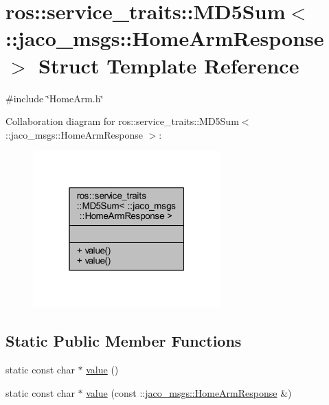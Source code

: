 \hypertarget{structros_1_1service__traits_1_1MD5Sum_3_01_1_1jaco__msgs_1_1HomeArmResponse_01_4}{}\section{ros\+:\+:service\+\_\+traits\+:\+:M\+D5\+Sum$<$ \+:\+:jaco\+\_\+msgs\+:\+:Home\+Arm\+Response $>$ Struct Template Reference}
\label{structros_1_1service__traits_1_1MD5Sum_3_01_1_1jaco__msgs_1_1HomeArmResponse_01_4}


{\ttfamily \#include \char`\"{}Home\+Arm.\+h\char`\"{}}



Collaboration diagram for ros\+:\+:service\+\_\+traits\+:\+:M\+D5\+Sum$<$ \+:\+:jaco\+\_\+msgs\+:\+:Home\+Arm\+Response $>$\+:
\nopagebreak
\begin{figure}[H]
\begin{center}
\leavevmode
\includegraphics[width=205pt]{d3/d62/structros_1_1service__traits_1_1MD5Sum_3_01_1_1jaco__msgs_1_1HomeArmResponse_01_4__coll__graph}
\end{center}
\end{figure}
\subsection*{Static Public Member Functions}
\begin{DoxyCompactItemize}
\item 
static const char $\ast$ \hyperlink{structros_1_1service__traits_1_1MD5Sum_3_01_1_1jaco__msgs_1_1HomeArmResponse_01_4_a2f200e0034ba1f9369f2da4d4ade7f78}{value} ()
\item 
static const char $\ast$ \hyperlink{structros_1_1service__traits_1_1MD5Sum_3_01_1_1jaco__msgs_1_1HomeArmResponse_01_4_a80f7851bf27ab05743a2a0d087f047b5}{value} (const \+::\hyperlink{namespacejaco__msgs_a2638ebb5f2f675bb527ce4144b66d386}{jaco\+\_\+msgs\+::\+Home\+Arm\+Response} \&)
\end{DoxyCompactItemize}



